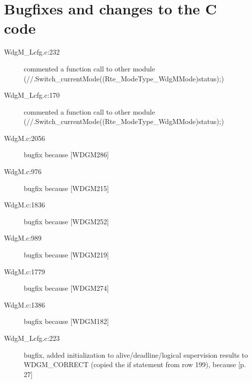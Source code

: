 \documentclass[11pt,a4paper]{article}
\begin{document}
\section{Bugfixes and changes to the C code}
\begin{description}
  \item[WdgM\_Lcfg.c:232] \parbox[t]{0.8\linewidth}{commented a function call to other module (//.Switch\_currentMode((Rte\_ModeType\_WdgMMode)status);)}
  \item[WdgM\_Lcfg.c:170] \parbox[t]{0.8\linewidth}{commented a function call to other module
(//.Switch\_currentMode((Rte\_ModeType\_WdgMMode)status);)}
  \item[WdgM.c:2056] bugfix because [WDGM286]
  \item[WdgM.c:976] bugfix because [WDGM215]
  \item[WdgM.c:1836] bugfix because [WDGM252]
  \item[WdgM.c:989] bugfix because [WDGM219]
  \item[WdgM.c:1779] bugfix because [WDGM274]
  \item[WdgM.c:1386] bugfix because [WDGM182]
  \item[WdgM\_Lcfg.c:223] \parbox[t]{0.8\linewidth}{bugfix, added initialization
      to alive/deadline/logical supervision results to WDGM\_CORRECT (copied the
      if statement from row 199), because [p. 27]}
\end{description}
\end{document}
